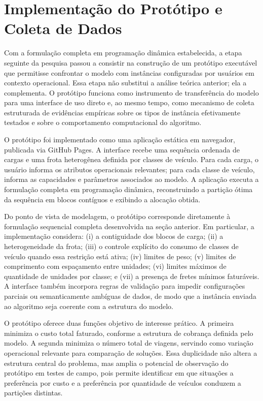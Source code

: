 \section{Implementação do Protótipo e Coleta de Dados}

Com a formulação completa em programação dinâmica estabelecida, a etapa
seguinte da pesquisa passou a consistir na construção de um protótipo
executável que permitisse confrontar o modelo com instâncias configuradas por
usuários em contexto operacional. Essa etapa não substitui a análise teórica
anterior; ela a complementa. O protótipo funciona como instrumento de
transferência do modelo para uma interface de uso direto e, ao mesmo tempo,
como mecanismo de coleta estruturada de evidências empíricas sobre os tipos de
instância efetivamente testados e sobre o comportamento computacional do
algoritmo.

O protótipo foi implementado como uma aplicação estática em navegador,
publicada via GitHub Pages. A interface recebe uma sequência ordenada de cargas
e uma frota heterogênea definida por classes de veículo. Para cada carga, o
usuário informa os atributos operacionais relevantes; para cada classe de
veículo, informa as capacidades e parâmetros associados ao modelo. A aplicação
executa a formulação completa em programação dinâmica, reconstruindo a
partição ótima da sequência em blocos contíguos e exibindo a alocação obtida.

Do ponto de vista de modelagem, o protótipo corresponde diretamente à
formulação sequencial completa desenvolvida na seção anterior. Em particular, a
implementação considera: (i) a contiguidade dos blocos de carga; (ii) a
heterogeneidade da frota; (iii) o controle explícito do consumo de classes de
veículo quando essa restrição está ativa; (iv) limites de peso; (v) limites de
comprimento com espaçamento entre unidades; (vi) limites máximos de quantidade
de unidades por classe; e (vii) a presença de fretes mínimos faturáveis. A
interface também incorpora regras de validação para impedir configurações
parciais ou semanticamente ambíguas de dados, de modo que a instância enviada
ao algoritmo seja coerente com a estrutura do modelo.

O protótipo oferece duas funções objetivo de interesse prático. A primeira
minimiza o custo total faturado, conforme a estrutura de cobrança definida pelo
modelo. A segunda minimiza o número total de viagens, servindo como variação
operacional relevante para comparação de soluções. Essa duplicidade não altera
a estrutura central do problema, mas amplia o potencial de observação do
protótipo em testes de campo, pois permite identificar em que situações a
preferência por custo e a preferência por quantidade de veículos conduzem a
partições distintas.

